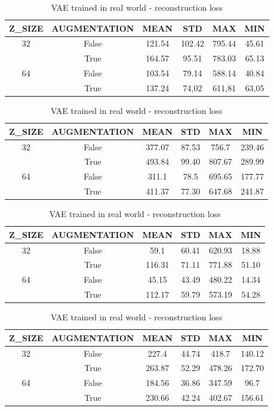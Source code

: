 \begin{table}[h]
  \centering
  \begin{tabular}{|c|c||c|c|c|c|}
  \hline
  Z\_SIZE & AUGMENTATION & MEAN & STD & MAX & MIN \\ \hline
  \multirow{2}{*}{32} & False & 121.54 & 102.42 & 795.44 & 45.61 \\
  & True & 164.57 & 95.51 & 783.03 & 65.13  \\ \hline
  \multirow{2}{*}{64} & False & 103.54 & 79.14 & 588.14 & 40.84 \\
  & True & 137.24 & 74,02 & 611,81 & 63,05  \\ \hline
  \end{tabular}
  \caption{AE trained in simulation - reconstruction loss}
  \label{tab:aesim}

  \begin{tabular}{|c|c||c|c|c|c|}
  \hline
  Z\_SIZE & AUGMENTATION & MEAN & STD & MAX & MIN \\ \hline
  \multirow{2}{*}{32} & False & 377.07 & 87.53 & 756.7 & 239.46 \\
  & True & 493.84 & 99.40 & 807.67 & 289.99  \\ \hline
  \multirow{2}{*}{64} & False & 311.1 & 78.5 & 695.65 & 177.77 \\
  & True & 411.37 & 77.30 & 647.68 & 241.87 \\ \hline
  \end{tabular}
  \caption{AE trained in real world - reconstruction loss}
  \label{tab:aereal}

  \begin{tabular}{|c|c||c|c|c|c|}
  \hline
  Z\_SIZE & AUGMENTATION & MEAN & STD & MAX & MIN \\ \hline
  \multirow{2}{*}{32} & False & 59.1 & 60.41 & 620.93 & 18.88 \\
  & True & 116.31 & 71.11 & 771.88 & 51.10  \\ \hline
  \multirow{2}{*}{64} & False & 45.15 & 43.49 & 480.22 & 14.34 \\
  & True & 112.17 & 59.79 & 573.19 & 54.28  \\ \hline
  \end{tabular}
  \caption{VAE trained in simulation - reconstruction loss}
  \label{tab:vaesim}

  \begin{tabular}{|c|c||c|c|c|c|}
  \hline
  Z\_SIZE & AUGMENTATION & MEAN & STD & MAX & MIN \\ \hline
  \multirow{2}{*}{32} & False & 227.4 & 44.74 & 418.7 & 140.12 \\
  & True & 263.87 & 52.29 & 478.26 & 172.70 \\ \hline
  \multirow{2}{*}{64} & False & 184.56 & 36.86 & 347.59 & 96.7 \\
  & True & 230.66 & 42.24 & 402.67 & 156.61  \\ \hline
  \end{tabular}
  \caption{VAE trained in real world - reconstruction loss}
  \label{tab:vaereal}
\end{table}

